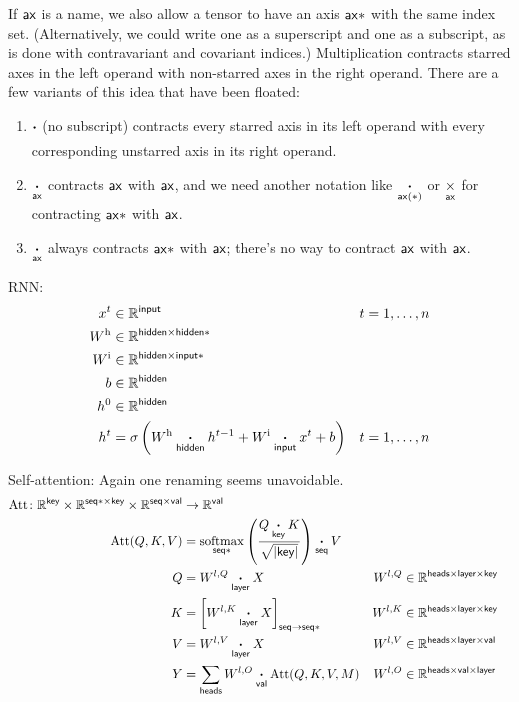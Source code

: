 If $\name{ax}$ is a name, we also allow a tensor to have an axis $\name{ax*}$ with the same index set. (Alternatively, we could write one as a superscript and one as a subscript, as is done with contravariant and covariant indices.) Multiplication contracts starred axes in the left operand with non-starred axes in the right operand.
There are a few variants of this idea that have been floated:
\begin{enumerate}
\item $\ndot{}$ (no subscript) contracts every starred axis in its left operand with every corresponding unstarred axis in its right operand.
\item $\ndot{ax}$ contracts $\name{ax}$ with $\name{ax}$, and we need another notation like $\ndot{ax(*)}$ or $\nbin{ax}{\times}$ for contracting $\name{ax*}$ with $\name{ax}$.
\item $\ndot{ax}$ always contracts $\name{ax*}$ with $\name{ax}$; there's no way to contract $\name{ax}$ with $\name{ax}$.
\end{enumerate}

RNN:
\begin{align*}
x^{t} &\in \mathbb{R}^{\name{input}} & t &= 1, \ldots, n \\
W^{\text{h}} &\in \mathbb{R}^{\name{hidden} \times \name{hidden*}} \\
W^{\text{i}} &\in \mathbb{R}^{\name{hidden} \times \name{input*}} \\
b &\in \mathbb{R}^{\name{hidden}} \\
h^{0} &\in \mathbb{R}^{\name{hidden}} \\
h^{t} &= \sigma\left( W^{\text{h}} \ndot{hidden} h^{t-1} + W^{\text{i}} \ndot{input} x^{t} + b \right) & t &= 1, \ldots, n
\end{align*}

Self-attention: Again one renaming seems unavoidable.
\begin{align*}
  \text{Att} \colon \mathbb{R}^{\name{key}} \times \mathbb{R}^{\name{seq*} \times\name{key}} \times \mathbb{R}^{\name{seq} \times\name{val}} &\rightarrow \mathbb{R}^{\name{val}} \\
  \text{Att}(Q,K,V) &= \nfun{seq*}{softmax} \left( \frac{Q \ndot{key} K}{\sqrt{|\name{key}|}} \right) \ndot{seq} V \\
  Q &= W^{l,Q} \ndot{layer} X & W^{l,Q} &\in \mathbb{R}^{\name{heads} \times \name{layer} \times \name{key}} \\
  K &= \nmov{seq}{seq*}{W^{l,K} \ndot{layer} X} & W^{l,K} &\in \mathbb{R}^{\name{heads} \times \name{layer} \times \name{key}} \\
  V &= W^{l,V} \ndot{layer} X & W^{l,V} &\in \mathbb{R}^{\name{heads} \times \name{layer} \times \name{val}} \\
  Y &= \nsum{heads} W^{l,O} \ndot{val} \text{Att}(Q, K, V, M) & W^{l,O} &\in \mathbb{R}^{\name{heads} \times \name{val} \times \name{layer}}
\end{align*}

